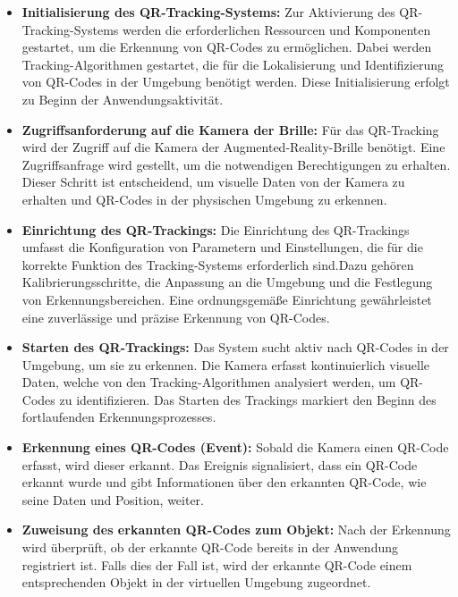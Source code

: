 \begin{itemize}

\item \textbf{Initialisierung des QR-Tracking-Systems:}
Zur Aktivierung des QR-Tracking-Systems werden die erforderlichen Ressourcen und Komponenten gestartet, um die Erkennung
von QR-Codes zu ermöglichen. Dabei werden Tracking-Algorithmen gestartet, die für die Lokalisierung und Identifizierung
von QR-Codes in der Umgebung benötigt werden. Diese Initialisierung erfolgt zu Beginn der Anwendungsaktivität.

\item \textbf{Zugriffsanforderung auf die Kamera der Brille:}
Für das QR-Tracking wird der Zugriff auf die Kamera der Augmented-Reality-Brille benötigt. Eine Zugriffsanfrage wird
gestellt, um die notwendigen Berechtigungen zu erhalten. Dieser Schritt ist entscheidend, um visuelle Daten von der Kamera
zu erhalten und QR-Codes in der physischen Umgebung zu erkennen.

\item \textbf{Einrichtung des QR-Trackings:}
Die Einrichtung des QR-Trackings umfasst die Konfiguration von Parametern und Einstellungen, die für die korrekte
Funktion des Tracking-Systems erforderlich sind.Dazu gehören Kalibrierungsschritte, die Anpassung an die Umgebung und die
Festlegung von Erkennungsbereichen. Eine ordnungsgemäße Einrichtung gewährleistet eine zuverlässige und präzise Erkennung von QR-Codes.

\item \textbf{Starten des QR-Trackings:}
Das System sucht aktiv nach QR-Codes in der Umgebung, um sie zu erkennen. Die Kamera erfasst kontinuierlich visuelle
Daten, welche von den Tracking-Algorithmen analysiert werden, um QR-Codes zu identifizieren. Das Starten des Trackings
markiert den Beginn des fortlaufenden Erkennungsprozesses.

\item \textbf{Erkennung eines QR-Codes (Event):}
Sobald die Kamera einen QR-Code erfasst, wird dieser erkannt. Das Ereignis signalisiert, dass ein QR-Code erkannt wurde
und gibt Informationen über den erkannten QR-Code, wie seine Daten und Position, weiter.

\item \textbf{Zuweisung des erkannten QR-Codes zum Objekt:}
Nach der Erkennung wird überprüft, ob der erkannte QR-Code bereits in der Anwendung registriert ist. Falls dies der Fall
ist, wird der erkannte QR-Code einem entsprechenden Objekt in der virtuellen Umgebung zugeordnet.


\end{itemize}
